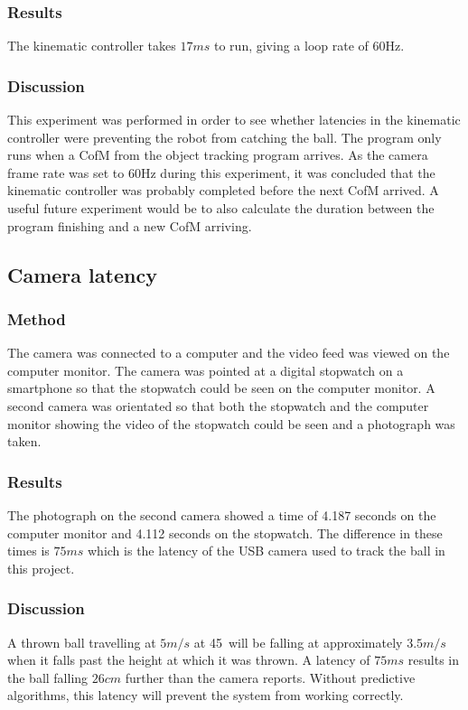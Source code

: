 \documentclass[conference]{IEEEtran}
\begin{document}
\subsubsection{Results}
The kinematic controller takes $17ms$ to run, giving a loop rate of 60Hz.
\subsubsection{Discussion}
This experiment was performed in order to see whether latencies in the kinematic controller were preventing the robot from catching the ball. The program only runs when a CofM from the object tracking program arrives. As the camera frame rate was set to 60Hz during this experiment, it was concluded that the kinematic controller was probably completed before the next CofM arrived. A useful future experiment would be to also calculate the duration between the program finishing and a new CofM arriving. 

\subsection{Camera latency}
\subsubsection{Method}
The camera was connected to a computer and the video feed was viewed on the computer monitor. The camera was pointed at a digital stopwatch on a smartphone so that the stopwatch could be seen on the computer monitor. A second camera was orientated so that both the stopwatch and the computer monitor showing the video of the stopwatch could be seen and a photograph was taken. 
\subsubsection{Results}
The photograph on the second camera showed a time of 4.187 seconds on the computer monitor and 4.112 seconds on the stopwatch. The difference in these times is $75ms$ which is the latency of the USB camera used to track the ball in this project.

\subsubsection{Discussion}A thrown ball travelling at $5m/s$ at 45\degree\ will be falling at approximately $3.5m/s$ when it falls past the height at which it was thrown.  A latency of $75ms$ results in the ball falling $26cm$ further than the camera reports. Without predictive algorithms, this latency will prevent the system from working correctly.
\end{document}
